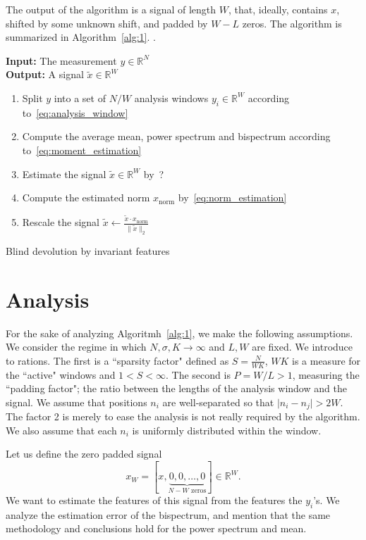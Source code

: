 \documentclass[journal]{IEEEtran}
\newcommand{\TODO}[1]{{\color{red}{[#1]}}}
\numberwithin{equation}{section}
\numberwithin{figure}{section}
\theoremstyle{plain}
\theoremstyle{definition}
\theoremstyle{remark}
\theoremstyle{plain}
\theoremstyle{remark}
\theoremstyle{plain}
\theoremstyle{plain}
\newcommand{\RN}{\mathbb{R}^N}
\begin{document}
The output of the algorithm is a signal of length $W$, that, ideally, contains $x$, shifted by some unknown shift, and padded by $W-L$ zeros. 
The algorithm is summarized in Algorithm~\ref{alg:1}.
\TODO{We should come up with a method to automatic aligning of the signal}.


\begin{algorithm}[h]
		\textbf{Input:} The measurement $y\in\RN$ \\ 
		\textbf{Output:} A signal $\tilde x\in\mathbb{R}^W$  \\ 
		\begin{enumerate}
			\item Split $y$ into a set of $N/W$ analysis windows $y_i\in\mathbb{R}^W$ according to~\eqref{eq:analysis_window}
			\item  Compute the average mean, power spectrum and bispectrum according to~\eqref{eq:moment_estimation} 
			\item  Estimate the signal $\tilde{x}\in\mathbb{R}^W$ by~?
			\item  Compute the estimated norm $x_{\textrm{norm}}$  by~\eqref{eq:norm_estimation}
			\item  Rescale the signal $\tilde x \gets \frac{\tilde{x}\cdot x_{\textrm{norm}}}{\|\tilde{x}\|_2} $   
			\TODO{Need to find a good alignment method} 
		\end{enumerate}
	\caption{Blind devolution by invariant features} 	\label{alg:1}
\end{algorithm}


\section{Analysis} \label{sec:analysis}

For the sake of analyzing Algoritmh~\ref{alg:1}, we make the following assumptions. We consider the regime in which $N,\sigma,K\to\infty$ and  $L,W$ are fixed. We introduce to rations. The first is a ``sparsity factor" defined as $S = \frac{N}{WK}$, $WK$ is a measure for the ``active" windows and $1<S<\infty$. The second is $P = W/L>1$, measuring the ``padding factor"; the ratio between the lengths of the analysis window and the signal. We assume that positions $n_i$ are well-separated so that $\vert n_i - n_j\vert >2W$. The factor 2 is merely to ease the analysis is not really required by the algorithm. We also assume that each $n_i$ is uniformly distributed within the window. 


Let us define  the zero padded signal $$x_W  = [x, \underbrace{0,0,\ldots,0}_{N-W \text{ zeros}}]\in\mathbb{R}^W.$$ 
We want to estimate the features of this signal from the features the $y_i$'s. We analyze the estimation error of the bispectrum, and mention that the same methodology and conclusions hold for the power spectrum and mean.
\end{document}
